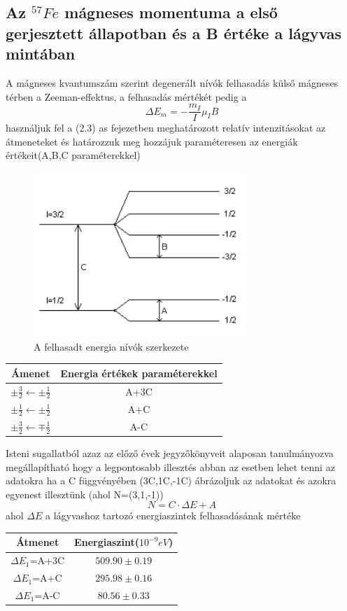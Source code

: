 \documentclass[a4paper,12pt]{article}
\numberwithin{equation}{subsection}
\begin{document}
 \subsection{Az $^{57}Fe$ mágneses momentuma a első gerjesztett állapotban és a B értéke a lágyvas mintában}
A mágneses kvantumszám szerint degenerált nívók felhasadás külső mágneses térben a Zeeman-effektus, a felhasadás mértékét pedig a \[\Delta E_m=-\frac{m_I}{I}\mu_IB\] használjuk fel a (2.3) as fejezetben meghatározott relatív intenzitásokat az átmeneteket és határozzuk meg hozzájuk paraméteresen az energiák értékeit(A,B,C paraméterekkel)
\begin{figure}[h!]
\centering
\includegraphics[width=8cm]{atmenet.png}
\caption{A felhasadt energia nívók szerkezete}
\end{figure}
\begin{table}[h!]
\centering
\begin{tabular}{c c}
Ámenet& Energia értékek paraméterekkel \\ \hline
$\pm \frac{3}{2}\leftarrow\pm\frac{1}{2}$& A+3C\\
$\pm \frac{1}{2}\leftarrow\pm\frac{1}{2}$& A+C\\
$\pm \frac{3}{2}\leftarrow\mp\frac{1}{2}$& A-C\\
\end{tabular}
\end{table}
Isteni sugallatból azaz az előző évek jegyzőkönyveit alaposan tanulmányozva megállapítható hogy a legpontosabb illesztés abban az esetben lehet tenni az adatokra ha a C függvényében (3C,1C,-1C) ábrázoljuk az adatokat és azokra egyenest illesztünk (ahol N=(3,1,-1))
\[N=C\cdot \Delta E+A\]  ahol $\Delta E$ a lágyvashoz tartozó energiaszintek felhasadásának mértéke
\begin{table}[h!]
\centering
\begin{tabular}{c c}
Átmenet & Energiaszint($10^{-9}eV$)\\ \hline
$\Delta E_1$=A+3C& $509.90\pm0.19$\\
$\Delta E_1$=A+C& $295.98\pm0.16$\\
$\Delta E_1$=A-C& $80.56\pm0.33$\\
\end{tabular}
\end{table}
\end{document}
